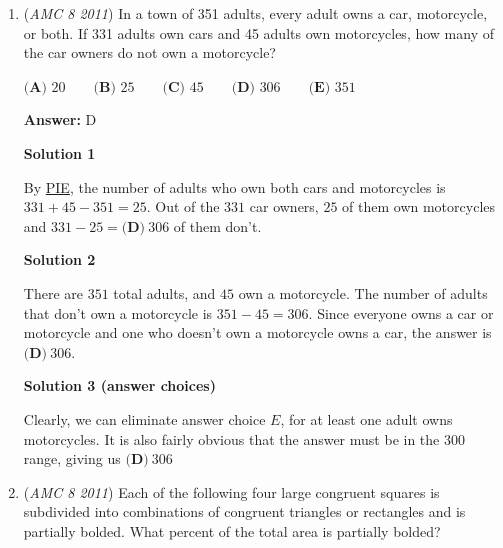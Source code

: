 \begin{enumerate}
\textbf{Solution 3 (Estimate)}

The answer choices are relatively far apart, so we can use estimation to solve this problem. $2100/60$ is around $35$ hours, or about $1.5$ days. The only answer choice around $1.5$ days from the midnight of January 1, 2011 is $\boxed{\textbf{(D)}\text{ January 2 at 9:31AM}}$.

 MegaBoy6679 :D 23:31, 26 December 2022 (EST)

 


	\item (\textit{AMC 8 2011}) In a town of 351 adults, every adult owns a car, motorcycle, or both. If 331 adults own cars and 45 adults own motorcycles, how many of the car owners do not own a motorcycle?


 $\textbf{(A) }20 \qquad\textbf{(B) }25 \qquad\textbf{(C) }45 \qquad\textbf{(D) }306 \qquad\textbf{(E) }351$

 \textbf{Answer: }D



\textbf{Solution 1}

By \href{https://artofproblemsolving.com/wiki/index.php?title=PIE}{PIE}, the number of adults who own both cars and motorcycles is $331+45-351=25.$ Out of the $331$ car owners, $25$ of them own motorcycles and $331-25=\boxed{\textbf{(D)}\ 306}$ of them don't.

 



\textbf{Solution 2}

There are $351$ total adults, and $45$ own a motorcycle. The number of adults that don't own a motorcycle is $351 - 45 = 306$. Since everyone owns a car or motorcycle and one who doesn't own a motorcycle owns a car, the answer is $\boxed{\textbf{(D)}\ 306}$.

 



\textbf{Solution 3 (answer choices)}

Clearly, we can eliminate answer choice $E$, for at least one adult owns motorcycles. It is also fairly obvious that the answer must be in the 300 range, giving us $\boxed{\textbf{(D)}\ 306}$



	\item (\textit{AMC 8 2011}) Each of the following four large congruent squares is subdivided into combinations of congruent triangles or rectangles and is partially bolded. What percent of the total area is partially bolded?



\end{enumerate}
